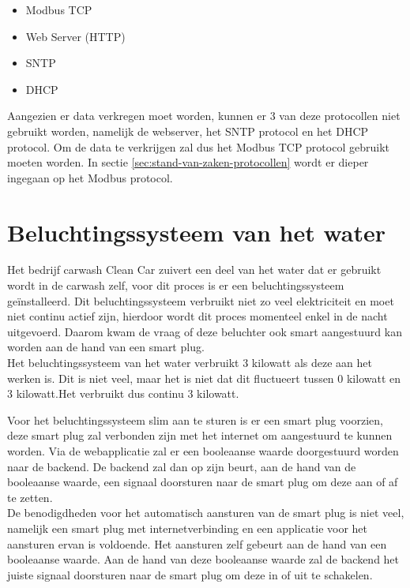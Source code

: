 \begin{itemize}
    \item Modbus TCP
    \item Web Server (HTTP)
    \item SNTP
    \item DHCP
\end{itemize}

Aangezien er data verkregen moet worden, kunnen er 3 van deze protocollen niet gebruikt worden, namelijk de webserver, het SNTP protocol en het DHCP protocol. Om de data te verkrijgen zal dus het Modbus TCP protocol gebruikt moeten worden. In sectie \ref{sec:stand-van-zaken-protocollen} wordt er dieper ingegaan op het Modbus protocol.

\section{Beluchtingssysteem van het water}
\label{sec:stand-van-zaken-beluchtingssysteem}

Het bedrijf carwash Clean Car zuivert een deel van het water dat er gebruikt wordt in de carwash zelf, voor dit proces is er een beluchtingssysteem geïnstalleerd. Dit beluchtingssysteem verbruikt niet zo veel elektriciteit en moet niet continu actief zijn, hierdoor wordt dit proces momenteel enkel in de nacht uitgevoerd. Daarom kwam de vraag of deze beluchter ook smart aangestuurd kan worden aan de hand van een smart plug.\\

Het beluchtingssysteem van het water verbruikt 3 kilowatt als deze aan het werken is. Dit is niet veel, maar het is niet dat dit fluctueert tussen 0 kilowatt en 3 kilowatt.Het verbruikt dus continu 3 kilowatt.\

Voor het beluchtingssysteem slim aan te sturen is er een smart plug voorzien, deze smart plug zal verbonden zijn met het internet om aangestuurd te kunnen worden. Via de webapplicatie zal er een booleaanse waarde doorgestuurd worden naar de backend. De backend zal dan op zijn beurt, aan de hand van de booleaanse waarde, een signaal doorsturen naar de smart plug om deze aan of af te zetten.\\

De benodigdheden voor het automatisch aansturen van de smart plug is niet veel, namelijk een smart plug met internetverbinding en een applicatie voor het aansturen ervan is voldoende. Het aansturen zelf gebeurt aan de hand van een booleaanse waarde. Aan de hand van deze booleaanse waarde zal de backend het juiste signaal doorsturen naar de smart plug om deze in of uit te schakelen.\\

